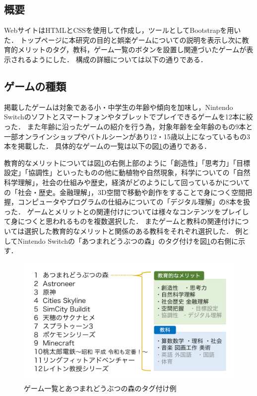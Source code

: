\documentclass[12pt,a4j,titlepage]{ltjsarticle}
\begin{document}
\subsection{概要}
WebサイトはHTMLとCSSを使用して作成し，ツールとしてBootstrapを用いた．
トップページに本研究の目的と娯楽ゲームについての説明を表示し次に教育的メリットのタグ，教科，ゲーム一覧のボタンを設置し関連づいたゲームが表示されるようにした．
構成の詳細については以下の通りである．

\subsection{ゲームの種類}
掲載したゲームは対象である小・中学生の年齢や傾向を加味し，Nintendo Switchのソフトとスマートフォンやタブレットでプレイできるゲームを12本に絞った．
また年齢に沿ったゲームの紹介を行う為，対象年齢を全年齢のもの9本と一部オンラインショップやバトルシーンがあり12・15歳以上になっているもの3本を掲載した．
具体的なゲームの一覧は以下の図\ref{fig:ゲーム一覧}の通りである．

教育的なメリットについては図\ref{fig:ゲーム一覧}の右側上部のように「創造性」「思考力」「目標設定」「協調性」といったものの他に動植物や自然現象，科学についての「自然科学理解」，社会の仕組みや歴史，経済がどのようにして回っているかについての「社会・歴史。金融理解」，3D空間で移動や創作をすることで身につく空間把握，コンピュータやプログラムの仕組みについての「デジタル理解」の8本を扱った．
ゲームとメリットとの関連付けについては様々なコンテンツをプレイして身につくと思われるものを複数選択した．
またゲームと教科の関連付けについては選択した教育的なメリットと関係のある教科をそれぞれ選択した．
例としてNintendo Switchの「あつまれどうぶつの森」のタグ付けを図\ref{fig:ゲーム一覧}の右側に示す．

\vspace{1zh}
\begin{figure}[H]
\begin{center}
 \includegraphics[keepaspectratio, scale=0.35]{games.pdf}
\end{center}
 \caption{ゲーム一覧とあつまれどうぶつの森のタグ付け例}
 \label{fig:ゲーム一覧}
\end{figure}
\end{document}
